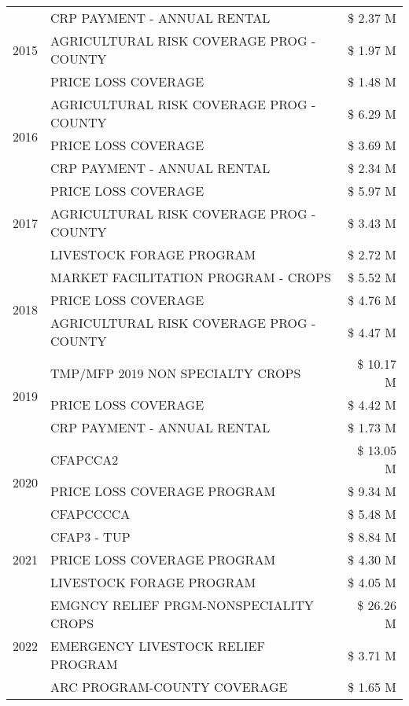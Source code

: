 \begin{tabular}{llr}
\cline{1-3}
\multirow[t]{3}{*}{2015} & CRP PAYMENT - ANNUAL RENTAL & \$ 2.37 M \\
 & AGRICULTURAL RISK COVERAGE PROG - COUNTY & \$ 1.97 M \\
 & PRICE LOSS COVERAGE & \$ 1.48 M \\
\cline{1-3}
\multirow[t]{3}{*}{2016} & AGRICULTURAL RISK COVERAGE PROG - COUNTY & \$ 6.29 M \\
 & PRICE LOSS COVERAGE & \$ 3.69 M \\
 & CRP PAYMENT - ANNUAL RENTAL & \$ 2.34 M \\
\cline{1-3}
\multirow[t]{3}{*}{2017} & PRICE LOSS COVERAGE & \$ 5.97 M \\
 & AGRICULTURAL RISK COVERAGE PROG - COUNTY & \$ 3.43 M \\
 & LIVESTOCK FORAGE PROGRAM & \$ 2.72 M \\
\cline{1-3}
\multirow[t]{3}{*}{2018} & MARKET FACILITATION PROGRAM - CROPS & \$ 5.52 M \\
 & PRICE LOSS COVERAGE & \$ 4.76 M \\
 & AGRICULTURAL RISK COVERAGE PROG - COUNTY & \$ 4.47 M \\
\cline{1-3}
\multirow[t]{3}{*}{2019} & TMP/MFP 2019 NON SPECIALTY CROPS & \$ 10.17 M \\
 & PRICE LOSS COVERAGE & \$ 4.42 M \\
 & CRP PAYMENT - ANNUAL RENTAL & \$ 1.73 M \\
\cline{1-3}
\multirow[t]{3}{*}{2020} & CFAPCCA2 & \$ 13.05 M \\
 & PRICE LOSS COVERAGE PROGRAM & \$ 9.34 M \\
 & CFAPCCCCA & \$ 5.48 M \\
\cline{1-3}
\multirow[t]{3}{*}{2021} & CFAP3 - TUP & \$ 8.84 M \\
 & PRICE LOSS COVERAGE PROGRAM & \$ 4.30 M \\
 & LIVESTOCK FORAGE PROGRAM & \$ 4.05 M \\
\cline{1-3}
\multirow[t]{3}{*}{2022} & EMGNCY RELIEF PRGM-NONSPECIALITY CROPS & \$ 26.26 M \\
 & EMERGENCY LIVESTOCK RELIEF PROGRAM & \$ 3.71 M \\
 & ARC PROGRAM-COUNTY COVERAGE & \$ 1.65 M \\
\cline{1-3}
\bottomrule
\end{tabular}
